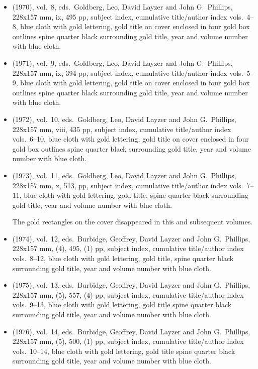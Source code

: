 \begin{itemize}
	\item (1970), vol.\ 8, eds.\ Goldberg, Leo, David Layzer and John G.\ Phillips, 228x157 mm,
	ix, 495 pp, subject index, cumulative title/author index vols.\ 4--8,
	blue cloth with gold lettering, gold title on cover enclosed in four gold box outlines
  spine quarter black surrounding gold title, year and volume number with blue cloth.
	
	\item (1971), vol.\ 9, eds.\ Goldberg, Leo, David Layzer and John G.\ Phillips, 228x157 mm,
	ix, 394 pp, subject index, cumulative title/author index vols.\ 5--9,
	blue cloth with gold lettering, gold title on cover enclosed in four gold box outlines
  spine quarter black surrounding gold title, year and volume number with blue cloth.
	
	\item (1972), vol.\ 10, eds.\ Goldberg, Leo, David Layzer and John G.\ Phillips, 228x157 mm,
	viii, 435 pp, subject index, cumulative title/author index vols.\ 6--10,
	blue cloth with gold lettering, gold title on cover enclosed in four gold box outlines
  spine quarter black surrounding gold title, year and volume number with blue cloth.
	
	\item (1973), vol.\ 11, eds.\ Goldberg, Leo, David Layzer and John G.\ Phillips, 228x157 mm,
	x, 513, pp, subject index, cumulative title/author index vols.\ 7--11,
	blue cloth with gold lettering, gold title,
  spine quarter black surrounding gold title, year and volume number with blue cloth.
  
  The gold rectangles on the cover disappeared in this and subsequent volumes.
	
	\item (1974), vol.\ 12, eds.\ Burbidge, Geoffrey, David Layzer and John G.\ Phillips, 228x157 mm,
	(4), 495, (1) pp, subject index, cumulative title/author index vols.\ 8--12,
	blue cloth with gold lettering, gold title,
  spine quarter black surrounding gold title, year and volume number with blue cloth.
	
	\item (1975), vol.\ 13, eds.\ Burbidge, Geoffrey, David Layzer and John G.\ Phillips, 228x157 mm,
	(5), 557, (4) pp, subject index, cumulative title/author index vols.\ 9--13,
	blue cloth with gold lettering, gold title
  spine quarter black surrounding gold title, year and volume number with blue cloth.
	
	\item (1976), vol.\ 14, eds.\ Burbidge, Geoffrey, David Layzer and John G.\ Phillips, 228x157 mm,
	(5), 500, (1) pp, subject index, cumulative title/author index vols.\ 10--14,
	blue cloth with gold lettering, gold title
  spine quarter black surrounding gold title, year and volume number with blue cloth.
	

\end{itemize}
